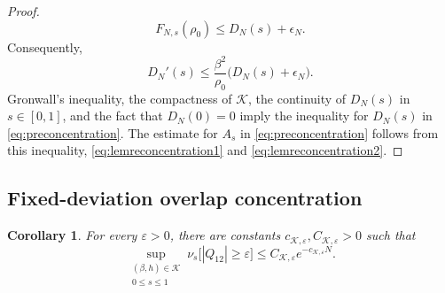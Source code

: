 \documentclass[11pt]{article}
\newtheorem{corollary}[theorem]{Corollary}
\numberwithin{equation}{section}
\newcommand{\1}{\mathbf 1}
\newcommand{\cK}{\mathcal K}
\begin{document}
\begin{proof}
\begin{equation}
 F_{N,s}(\rho_0)
 \le D_N(s)+\epsilon_N.
\end{equation}
Consequently,
\begin{equation}
 D_N'(s)
 \le\frac{\beta^2}{\rho_0}
 \bigl(D_N(s)+\epsilon_N\bigr).
 \label{eq:gronwallDN}
\end{equation}
Gronwall's inequality, the compactness of $\cK$, the continuity of $D_N (s)$ in $s\in [0,1]$, and the fact that $D_N(0)=0$ imply the inequality for $D_N(s)$ in \eqref{eq:preconcentration}.
The estimate for $A_s$ in \eqref{eq:preconcentration} follows from this inequality, \eqref{eq:lemreconcentration1} and \eqref{eq:lemreconcentration2}.
\end{proof}


\subsection{Fixed-deviation overlap concentration}\label{subsec:tails}

\begin{corollary}
\label{cor:tail}
For every $\varepsilon>0$, there are constants
$c_{\cK,\varepsilon},C_{\cK,\varepsilon}>0$ such that
\begin{equation}
 \sup_{\substack{(\beta,h)\in\cK\\0\le s\le1}}
 \nu_s\bigl[|Q_{12}|\ge\varepsilon\bigr]
 \le C_{\cK,\varepsilon}e^{-c_{\cK,\varepsilon}N}.
 \label{eq:tail}
\end{equation}
\end{corollary}
\end{document}
